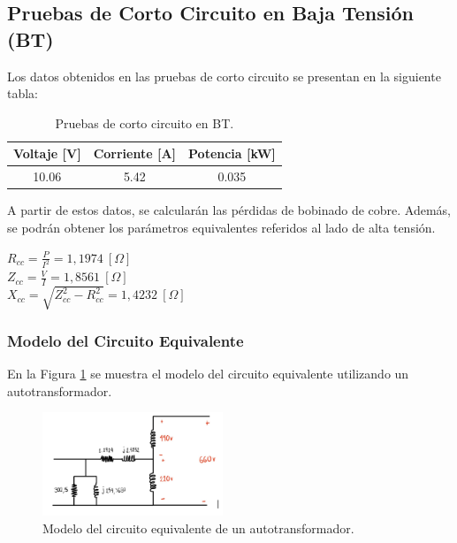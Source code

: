 \subsection{Pruebas de Corto Circuito en Baja Tensión (BT)}

Los datos obtenidos en las pruebas de corto circuito se presentan en la siguiente tabla:

\begin{table}[h!]
\centering
\begin{tabular}{|c|c|c|}
\hline
\textbf{Voltaje [V]} & \textbf{Corriente [A]} & \textbf{Potencia [kW]} \\ \hline
10.06               & 5.42                   & 0.035                  \\ \hline
\end{tabular}
\caption{Pruebas de corto circuito en BT.}
\end{table}

A partir de estos datos, se calcularán las pérdidas de bobinado de cobre. Además, se podrán obtener los parámetros equivalentes referidos al lado de alta tensión.

\begin{center}
    $R_{cc} = \frac{P}{I^2} = 1,1974~[\Omega]$ \\
    \vspace{0.2cm}
    $Z_{cc} = \frac{V}{I} = 1,8561~[\Omega] $ \\
    \vspace{0.2cm}
    $X_{cc} = \sqrt{Z_{cc}^2 - R_{cc}^2} = 1,4232~[\Omega]$ \\
\end{center}


\subsubsection{Modelo del Circuito Equivalente}

En la Figura \ref{fig:modelo_autotransformador} se muestra el modelo del circuito equivalente utilizando un autotransformador.

\begin{figure}[ht!]
    \centering
    \includegraphics[width=0.48\textwidth]{fot/prac4_regula.png}
    \caption{Modelo del circuito equivalente de un autotransformador.}
    \label{fig:modelo_autotransformador}
\end{figure}


